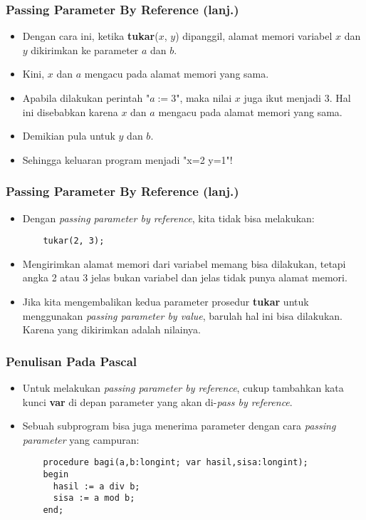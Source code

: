 \documentclass{beamer}
\begin{document}
\begin{frame}[fragile]
\frametitle{Passing Parameter By Reference (lanj.)}
\begin{itemize}
  \item Dengan cara ini, ketika \textbf{tukar}($x$, $y$) dipanggil, \alert{alamat memori variabel} $x$ dan $y$ dikirimkan ke parameter $a$ dan $b$.
  \item Kini, $x$ dan $a$ mengacu pada alamat memori yang sama.
  \item Apabila dilakukan perintah "$a := 3$", maka nilai $x$ juga ikut menjadi 3. Hal ini disebabkan karena $x$ dan $a$ mengacu pada \alert{alamat memori yang sama}.
  \item Demikian pula untuk $y$ dan $b$.
  \item Sehingga keluaran program menjadi "x=2 y=1"!
\end{itemize}
\end{frame}

\begin{frame}[fragile]
\frametitle{Passing Parameter By Reference (lanj.)}
\begin{itemize}
  \item Dengan \textit{passing parameter by reference}, kita tidak bisa melakukan:
  \begin{lstlisting}
    tukar(2, 3);
  \end{lstlisting}

  \item Mengirimkan alamat memori dari variabel memang bisa dilakukan, tetapi angka 2 atau 3 jelas bukan variabel dan jelas \alert{tidak punya alamat memori}.
  \item Jika kita mengembalikan kedua parameter prosedur \textbf{tukar} untuk menggunakan \textit{passing parameter by value}, barulah hal ini bisa dilakukan. Karena yang dikirimkan adalah \alert{nilainya}.
\end{itemize}
\end{frame}

\begin{frame}[fragile]
\frametitle{Penulisan Pada Pascal}
\begin{itemize}
  \item Untuk melakukan \textit{passing parameter by reference}, cukup tambahkan kata kunci \textbf{var} di depan parameter yang akan di-\textit{pass by reference}.
  \item Sebuah subprogram bisa juga menerima parameter dengan cara \textit{passing parameter} yang campuran:
  \begin{lstlisting}
    procedure bagi(a,b:longint; var hasil,sisa:longint);
    begin
      hasil := a div b;
      sisa := a mod b;
    end;
  \end{lstlisting}
\end{itemize}
\end{frame}
\end{document}
